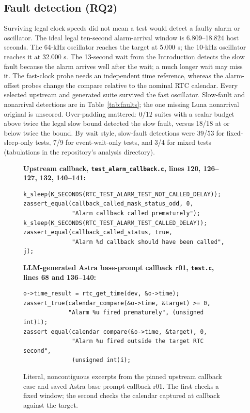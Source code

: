 \documentclass[sigconf,nonacm]{acmart}
\begin{document}
\subsection{Fault detection (RQ2)}
Surviving legal clock speeds did not mean a test would detect a faulty alarm or oscillator. The ideal legal ten-second alarm-arrival window is 6.809--18.824 host seconds. The 64-kHz oscillator reaches the target at 5.000 s; the 10-kHz oscillator reaches it at 32.000 s. The 13-second wait from the Introduction detects the slow fault because the alarm arrives well after the wait; a much longer wait may miss it. The fast-clock probe needs an independent time reference, whereas the alarm-offset probes change the compare relative to the nominal RTC calendar. Every selected upstream and generated suite survived the fast oscillator. Slow-fault and nonarrival detections are in Table~\ref{tab:faults}; the one missing Luna nonarrival original is unscored. Over-padding mattered: 0/12 suites with a scalar budget above twice the legal slow bound detected the slow fault, versus 18/18 at or below twice the bound. By wait style, slow-fault detections were 39/53 for fixed-sleep-only tests, 7/9 for event-wait-only tests, and 3/4 for mixed tests (tabulations in the repository's analysis directory).



\begin{figure}[!t]
\footnotesize
\textbf{Upstream callback, \texttt{test\_alarm\_callback.c}, lines 120, 126--127, 132, 140--141:}
\begin{verbatim}
k_sleep(K_SECONDS(RTC_TEST_ALARM_TEST_NOT_CALLED_DELAY));
zassert_equal(callback_called_mask_status_odd, 0,
              "Alarm callback called prematurely");
k_sleep(K_SECONDS(RTC_TEST_ALARM_TEST_CALLED_DELAY));
zassert_equal(callback_called_status, true,
              "Alarm %d callback should have been called", j);
\end{verbatim}
\textbf{LLM-generated Astra base-prompt callback r01, \texttt{test.c}, lines 68 and 136--140:}
\begin{verbatim}
o->time_result = rtc_get_time(dev, &o->time);
zassert_true(calendar_compare(&o->time, &target) >= 0,
             "Alarm %u fired prematurely", (unsigned int)i);
zassert_equal(calendar_compare(&o->time, &target), 0,
              "Alarm %u fired outside the target RTC second",
              (unsigned int)i);
\end{verbatim}
\caption{Literal, noncontiguous excerpts from the pinned upstream callback case and saved Astra base-prompt callback r01. The first checks a fixed window; the second checks the calendar captured at callback against the target.}
\label{fig:sourcecontrast}
\end{figure}
\end{document}
